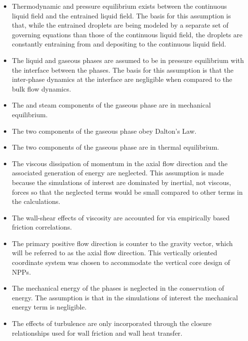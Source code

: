 \begin{itemize}
\item{
Thermodynamic and pressure equilibrium exists between the continuous liquid field and the entrained liquid field.
The basis for this assumption is that, while the entrained droplets are being modeled by a separate set of governing equations than those of the continuous liquid field, the droplets are constantly entraining from and depositing to the continuous liquid field. 
}
\item{
The liquid and gaseous phases are assumed to be in pressure equilibrium with the interface between the phases.
The basis for this assumption is that the inter-phase dynamics at the interface are negligible when compared to the bulk flow dynamics.
}
\item{The \ncg{} and steam components of the gaseous phase are in mechanical equilibrium.}
\item{The two components of the gaseous phase obey Dalton's Law.}
\item{The two components of the gaseous phase are in thermal equilibrium.}
\item{
The viscous dissipation of momentum in the axial flow direction and the associated generation of energy are neglected.
This assumption is made because the simulations of interest are dominated by inertial, not viscous, forces so that the neglected terms would be small compared to other terms in the calculations.
}
\item{
The wall-shear effects of viscosity are accounted for via empirically based friction correlations.
}
\item{
The primary positive flow direction is counter to the gravity vector, which will be referred to as the axial flow direction. This vertically oriented coordinate system was chosen to accommodate the vertical core design of NPPs.}
\item{
The mechanical energy of the phases is neglected in the conservation of energy. 
The assumption is that in the simulations of interest the mechanical energy term is negligible.
}
\item{
The effects of turbulence are only incorporated through the closure relationships used for wall friction and wall heat transfer.
}
\end{itemize}


